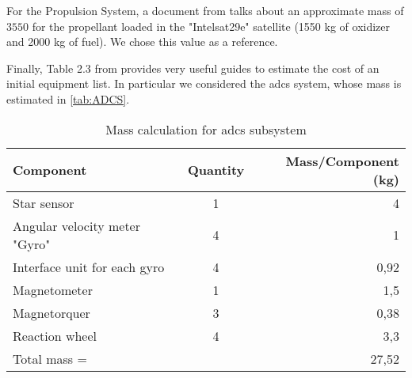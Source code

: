 For the Propulsion System, a document from \cite{intelsat29e} talks about an approximate mass of $3550$ for the propellant loaded in the "Intelsat29e" satellite (1550 kg of oxidizer and 2000 kg of fuel). We chose this value as a reference.

Finally, Table 2.3 from \cite{Abdelal2013} provides very useful guides to estimate the cost of an initial equipment list. In particular we considered the \gls{adcs} system, whose mass is estimated in \autoref{tab:ADCS}.

\begin{table}[ht]
	\centering
	\begin{tabular}{lcr}
		\toprule
		Component & Quantity & Mass/Component (kg)\\
		\midrule
		Star sensor & 1 & 4\\
		Angular velocity meter "Gyro" & 4 & 1\\
		Interface unit for each gyro & 4 & 0,92\\
		Magnetometer & 1 & 1,5\\
		Magnetorquer & 3 & 0,38\\
		Reaction wheel & 4 & 3,3\\
		\midrule
		Total mass = & & 27,52\\
		\bottomrule
	\end{tabular}
	\caption{Mass calculation for \gls{adcs} subsystem}
	\label{tab:ADCS}
\end{table}
